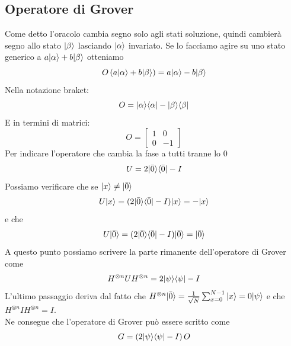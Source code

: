 \documentclass[12pt, a4paper]{report}
\begin{document}
\subsection{Operatore di Grover}
Come detto l'oracolo cambia segno solo agli stati soluzione, quindi cambierà segno allo stato $| \beta \rangle$ lasciando $| \alpha \rangle$ invariato. Se lo facciamo agire su uno stato generico a $a| \alpha \rangle+b| \beta \rangle$ otteniamo
\begin{equation*}
    O\left(a| \alpha \rangle+b| \beta \rangle\right) = a| \alpha \rangle-b| \beta \rangle
\end{equation*}
Nella notazione braket:
\begin{equation*}
    O = | \alpha \rangle\langle \alpha |-| \beta \rangle\langle \beta |
\end{equation*}
E in termini di matrici:
\begin{equation*}
    O = \begin{bmatrix}
        1 & 0 \\
        0 & -1
    \end{bmatrix}
\end{equation*}
Per indicare l'operatore che cambia la fase a tutti tranne lo 0
\begin{equation*}
    U  = 2| \bar{0} \rangle\langle \bar{0} |-I
\end{equation*}
Possiamo verificare che se $| x \rangle\neq| \bar{0} \rangle$
\begin{equation*}
    U| x \rangle = (2| \bar{0} \rangle\langle \bar{0} |-I)| x \rangle = -| x \rangle
\end{equation*}
e che 
\begin{equation*}
    U| \bar{0} \rangle = (2| \bar{0} \rangle\langle \bar{0} |-I)| \bar{0} \rangle = | \bar{0} \rangle
\end{equation*}
A questo punto possiamo scrivere la parte rimanente dell'operatore di Grover  come
\begin{equation*}
    H^{\otimes n}UH^{\otimes n} = 2| \psi \rangle\langle \psi |-I
\end{equation*}
L'ultimo passaggio deriva dal fatto che $H^{\otimes n}| \bar{0} \rangle=\frac{1}{\sqrt{N}}\sum_{x=0}^{N-1}| x \rangle=0| \psi \rangle$ e che $H^{\otimes n}IH^{\otimes n}=I$.\\
Ne consegue che l'operatore di Grover può essere scritto come
\begin{equation*}
    G=\left(2| \psi \rangle\langle \psi |-I\right)O
\end{equation*}
\end{document}
